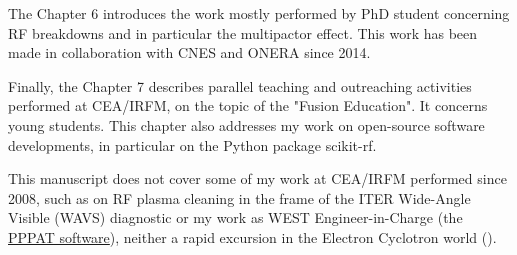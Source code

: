 The Chapter 6 introduces the work mostly performed by PhD student concerning RF breakdowns and in particular the multipactor effect. This work has been made in collaboration with CNES and ONERA since 2014.

Finally, the Chapter 7 describes parallel teaching and outreaching activities performed at CEA/IRFM, on the topic of the "Fusion Education". It concerns young students. This chapter also addresses my work on open-source software developments, in particular on the Python package scikit-rf. 

This manuscript does not cover some of my work at CEA/IRFM performed since 2008, such as on RF plasma cleaning in the frame of the ITER Wide-Angle Visible (WAVS) diagnostic or my work as WEST Engineer-in-Charge (the \href{https://github.com/IRFM/PPPAT/}{PPPAT software}), neither a rapid excursion in the Electron Cyclotron world ().
